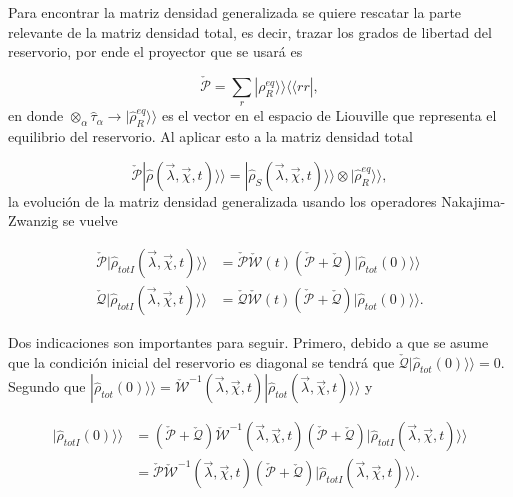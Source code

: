 \begin{appendixs}
Para encontrar la matriz densidad generalizada se quiere rescatar la parte relevante de la matriz densidad total, es decir, trazar los grados de libertad del reservorio, por ende el proyector que se usará es 

\begin{equation*}
    \check{\mathcal{P}} = \sum_{r}|\rho_{R}^{eq} \rangle \rangle \langle \langle rr|,
\end{equation*}
en donde $\otimes_{\alpha} \hat{\tau}_{\alpha} \to  |\hat{\rho}_{R}^{eq} \rangle \rangle$ es el vector en el espacio de Liouville que representa el equilibrio del reservorio. Al aplicar esto a la matriz densidad total

\begin{equation*}
    \check{\mathcal{P}}|\hat{\rho}(\vec{\lambda},\vec{\chi},t) \rangle \rangle = |\hat{\rho}_{S}(\vec{\lambda},\vec{\chi},t)\rangle \rangle \otimes |\hat{\rho}^{eq}_{R}\rangle \rangle ,
\end{equation*}
la evolución de la matriz densidad generalizada usando los operadores Nakajima-Zwanzig se vuelve 

\begin{align}
    \check{\mathcal{P}}|\hat{\rho}_{totI}(\vec{\lambda},\vec{\chi},t)\rangle \rangle & =  \check{\mathcal{P}} \check{\mathcal{W}}(t)( \check{\mathcal{P}} +  \check{\mathcal{Q}})|\hat{\rho}_{tot}(0)\rangle \rangle  \label{apendix2proyectionev1} \\
    \check{\mathcal{Q}}|\hat{\rho}_{totI}(\vec{\lambda},\vec{\chi},t)\rangle \rangle & = \check{\mathcal{Q}} \check{\mathcal{W}}(t)( \check{\mathcal{P}} +  \check{\mathcal{Q}})|\hat{\rho}_{tot}(0)\rangle \rangle. 
\label{apendix2proyectionev}
\end{align}

Dos indicaciones son importantes para seguir. Primero, debido a que se asume que la condición inicial del reservorio es diagonal se tendrá que $\check{\mathcal{Q}}|\hat{\rho}_{tot}(0)\rangle\rangle = 0 $. Segundo 
 que $|\hat{\rho}_{tot}(0)\rangle \rangle = \check{\mathcal{W}}^{-1}(\vec{\lambda},\vec{\chi},t)|\hat{\rho}_{tot}(\vec{\lambda},\vec{\chi},t)\rangle \rangle$ y

\begin{align*}
    |\hat{\rho}_{totI}(0)\rangle \rangle & = (\check{\mathcal{P}} + \check{\mathcal{Q}} )\check{\mathcal{W}}^{-1}(\vec{\lambda},\vec{\chi},t)(\check{\mathcal{P}} + \check{\mathcal{Q}})|\hat{\rho}_{totI}(\vec{\lambda},\vec{\chi},t)\rangle \rangle \\
        & = \check{\mathcal{P}}\check{\mathcal{W}}^{-1}(\vec{\lambda},\vec{\chi},t)(\check{\mathcal{P}} + \check{\mathcal{Q}})|\hat{\rho}_{totI}(\vec{\lambda},\vec{\chi},t)\rangle \rangle.
\end{align*}


\end{appendixs}
